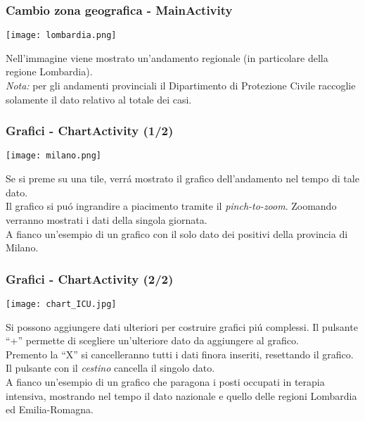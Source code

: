 \documentclass{beamer}
\newcommand{\quotes}[1]{``#1''}
\begin{document}
    \begin{frame}
        \frametitle{Cambio zona geografica - MainActivity}
        \noindent\begin{minipage}{0.3\textwidth}%
            \texttt{[image: lombardia.png]}
        \end{minipage}%
        \hfill%
        \begin{minipage}{0.6\textwidth}\raggedright
            Nell'immagine viene mostrato un'andamento regionale (in particolare della regione Lombardia).
            \\
            \emph{Nota:} per gli andamenti provinciali il Dipartimento di Protezione Civile raccoglie solamente il dato relativo al totale dei casi.
        \end{minipage}
    \end{frame}

    \begin{frame}
        \frametitle{Grafici - ChartActivity (1/2)}
        \noindent\begin{minipage}{0.3\textwidth}%
            \texttt{[image: milano.png]}
        \end{minipage}%
        \hfill%
        \begin{minipage}{0.6\textwidth}\raggedright
            Se si preme su una tile, verrá mostrato il grafico dell'andamento nel tempo di tale dato.
            \\
            Il grafico si puó ingrandire a piacimento tramite il \emph{pinch-to-zoom}. 
            Zoomando verranno mostrati i dati della singola giornata.
            \\
            A fianco un'esempio di un grafico con il solo dato dei positivi della provincia di Milano.
        \end{minipage}
    \end{frame}

    \begin{frame}
        \frametitle{Grafici - ChartActivity (2/2)}
        \noindent\begin{minipage}{0.3\textwidth}%
            \texttt{[image: chart\_ICU.jpg]}
        \end{minipage}%
        \hfill%
        \begin{minipage}{0.6\textwidth}\raggedright
            Si possono aggiungere dati ulteriori per costruire grafici piú complessi. Il pulsante \quotes{+} permette di scegliere un'ulteriore dato da aggiungere al grafico.
            \\
            Premento la \quotes{X} si cancelleranno tutti i dati finora inseriti, resettando il grafico.
            \\
            Il pulsante con il \emph{cestino} cancella il singolo dato.
            \\
            A fianco un'esempio di un grafico che paragona i posti occupati in terapia intensiva, mostrando nel tempo il dato nazionale e quello delle regioni Lombardia ed Emilia-Romagna.
        \end{minipage}
    \end{frame}
\end{document}
